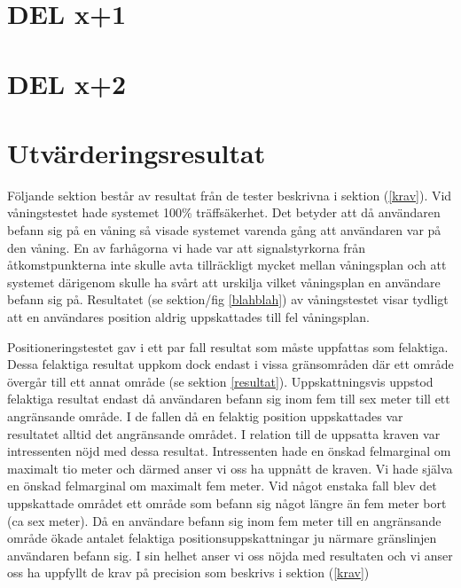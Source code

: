 \documentclass[swedish, a4paper,12pt]{article}
\begin{document}
\section{DEL x+1}
\section{DEL x+2}

\fi

\section{Utvärderingsresultat}\label{utvarderingsresultat}

Följande sektion består av resultat från de tester beskrivna i sektion (\ref{krav}). Vid våningstestet hade systemet 100\% träffsäkerhet. Det betyder att då användaren befann sig på en våning så visade systemet varenda gång att användaren var på den våning. En av farhågorna vi hade var att signalstyrkorna från åtkomstpunkterna inte skulle avta tillräckligt mycket mellan våningsplan och att systemet därigenom skulle ha svårt att urskilja vilket våningsplan en användare befann sig på. Resultatet (se sektion/fig \ref{blahblah}) av våningstestet visar tydligt att en användares position aldrig uppskattades till fel våningsplan.        %

Positioneringstestet gav i ett par fall resultat som måste uppfattas som felaktiga. Dessa felaktiga resultat uppkom dock endast i vissa gränsområden där ett område övergår till ett annat område (se sektion \ref{resultat}). Uppskattningsvis uppstod felaktiga resultat endast då användaren befann sig inom fem till sex meter till ett angränsande område. I de fallen då en felaktig position uppskattades var resultatet alltid det angränsande området. I relation till de uppsatta kraven var intressenten nöjd med dessa resultat. Intressenten hade en önskad felmarginal om maximalt tio meter och därmed anser vi oss ha uppnått de kraven. Vi hade själva en önskad felmarginal om maximalt fem meter. Vid något enstaka fall blev det uppskattade området ett område som befann sig något längre än fem meter bort (ca sex meter). Då en användare befann sig inom fem meter till en angränsande område ökade antalet felaktiga positionsuppskattningar ju närmare gränslinjen användaren befann sig. I sin helhet anser vi oss nöjda med resultaten och vi anser oss ha uppfyllt de krav på precision som beskrivs i sektion (\ref{krav})    %
\end{document}
